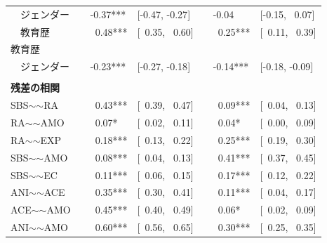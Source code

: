 \documentclass[a4j,12pt]{jreport}
\begin{document}
\begin{table}[H]
{\begin{threeparttable}
\begin{tabular}{@{}lllllll@{}}
~~ジェンダー                          &  & -0.37***                      & {[}-0.47, -0.27{]}   &  & -0.04                         & {[}-0.15, ~0.07{]}  \\
~~教育歴                       &  & ~0.48***                     & {[}~0.35, ~0.60{]} &  & ~0.25***                     & {[}~0.11, ~0.39{]} \\
教育歴                           &  &                               &                      &  &                               &                      \\
~~ジェンダー                          &  & -0.23***                      & {[}-0.27, -0.18{]}   &  & -0.14***                      & {[}-0.18, -0.09{]}   \\
                                    &  &                               &                      &  &                               &                      \\
\textbf{残差の相関}                &  &                               &                      &  &                               &                      \\
SBS$\sim$$\sim$RA                   &  & ~0.43***                     & {[}~0.39, ~0.47{]} &  & ~0.09***                     & {[}~0.04, ~0.13{]} \\
RA$\sim$$\sim$AMO                   &  & ~0.07* & {[}~0.02, ~0.11{]} &  & ~0.04* & {[}~0.00, ~0.09{]} \\
RA$\sim$$\sim$EXP                   &  & ~0.18***                     & {[}~0.13, ~0.22{]} &  & ~0.25***                     & {[}~0.19, ~0.30{]} \\
SBS$\sim$$\sim$AMO                  &  & ~0.08***                     & {[}~0.04, ~0.13{]} &  & ~0.41***                     & {[}~0.37, ~0.45{]} \\
SBS$\sim$$\sim$EC                   &  & ~0.11***                     & {[}~0.06, ~0.15{]} &  & ~0.17***                     & {[}~0.12, ~0.22{]} \\
ANI$\sim$$\sim$ACE                  &  & ~0.35***                     & {[}~0.30, ~0.41{]} &  & ~0.11***                     & {[}~0.04, ~0.17{]} \\
ACE$\sim$$\sim$AMO                  &  & ~0.45***                     & {[}~0.40, ~0.49{]} &  & ~0.06* & {[}~0.02, ~0.09{]} \\
ANI$\sim$$\sim$AMO                  &  & ~0.60***                     & {[}~0.56, ~0.65{]} &  & ~0.30***                     & {[}~0.25, ~0.35{]} \\

\end{tabular}
\end{threeparttable}}
\end{table}
\end{document}
